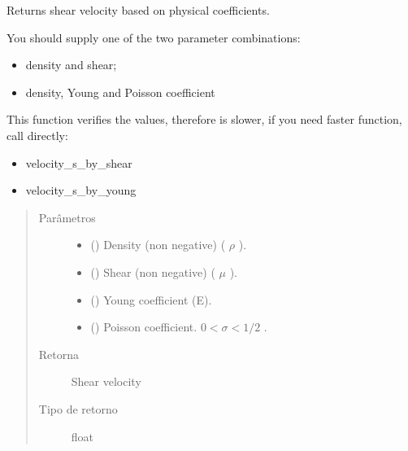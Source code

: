 \documentclass[letterpaper,10pt,brazil]{sphinxmanual}
\begin{document}

\begin{fulllineitems}
\label{\detokenize{source/base:base.Vs}}
Returns shear velocity based on physical coefficients.

You should supply one of the two parameter combinations:
\begin{itemize}
\item {} 
density and shear;

\item {} 
density, Young and Poisson coefficient

\end{itemize}

This function verifies the values, therefore is slower, if you need faster
function, call directly:
\begin{itemize}
\item {} 
velocity\_s\_by\_shear

\item {} 
velocity\_s\_by\_young

\end{itemize}
\begin{quote}\begin{description}
\item[{Parâmetros}] \leavevmode\begin{itemize}
\item {} 
 () \textendash{} Density (non negative) ( \(\rho\) ).

\item {} 
 () \textendash{} Shear (non negative) ( \(\mu\) ).

\item {} 
 () \textendash{} Young coefficient (E).

\item {} 
 () \textendash{} Poisson coefficient. \(0 < \sigma < 1/2\) .

\end{itemize}

\item[{Retorna}] \leavevmode
Shear velocity

\item[{Tipo de retorno}] \leavevmode
float

\end{description}\end{quote}

\end{fulllineitems}
\end{document}
